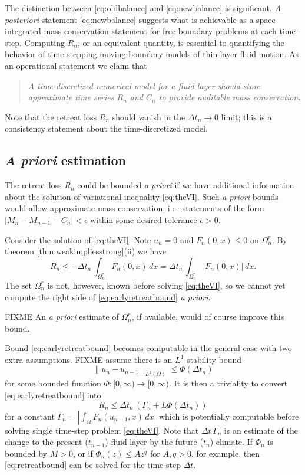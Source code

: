 \documentclass[final,onefignum]{siamart190516}
\newcommand\eps{\epsilon}
\begin{document}
The distinction between \eqref{eq:oldbalance} and \eqref{eq:newbalance} is significant.  \emph{A posteriori} statement \eqref{eq:newbalance} suggests what is achievable as a space-integrated mass conservation statement for free-boundary problems at each time-step.  Computing $R_n$, or an equivalent quantity, is essential to quantifying the behavior of time-stepping moving-boundary models of thin-layer fluid motion.  As an operational statement we claim that
\begin{quote}
\emph{A time-discretized numerical model for a fluid layer should store approximate time series $R_n$ and $C_n$ to provide auditable mass conservation.}
\end{quote}
Note that the retreat loss $R_n$ should vanish in the $\Delta t_n\to 0$ limit; this is a consistency statement about the time-discretized model.

\subsection{\emph{A priori} estimation} \label{subsec:apriori}   The retreat loss $R_n$ could be bounded \emph{a priori} if we have additional information about the solution of variational inequality \eqref{eq:theVI}.  Such \emph{a priori} bounds would allow approximate mass conservation, i.e.~statements of the form $|M_n - M_{n-1} - C_n|<\eps$ within some desired tolerance $\eps>0$.

Consider the solution of \eqref{eq:theVI}.  Note $u_n=0$ and $F_n(0,x)\le 0$ on $\Omega_n^r$.  By theorem \ref{thm:weakimpliesstrong}(ii) we have
\begin{equation}
R_n \le - \Delta t_n\,\int_{\Omega_n^r} F_n(0,x)\,dx = \Delta t_n\,\int_{\Omega_n^r} |F_n(0,x)|\,dx.  \label{eq:earlyretreatbound}
\end{equation}
The set $\Omega_n^r$ is not, however, known before solving \eqref{eq:theVI}, so we cannot yet compute the right side of \eqref{eq:earlyretreatbound} \emph{a priori}.

FIXME  An \emph{a priori} estimate of $\Omega_n^r$, if available, would of course improve this bound.

Bound \eqref{eq:earlyretreatbound} becomes computable in the general case with two extra assumptions.  FIXME assume there is an $L^1$ stability bound
\begin{equation}
\|u_n-u_{n-1}\|_{L^1(\Omega)} \le \Phi(\Delta t_n)
\end{equation}
for some bounded function $\Phi : [0,\infty) \to [0,\infty)$.  It is then a triviality to convert \eqref{eq:earlyretreatbound} into
\begin{equation}
R_n \le \Delta t_n\,\left(\Gamma_n + L \Phi(\Delta t_n)\right)   \label{eq:retreatbound}
\end{equation}
for a constant $\Gamma_n=\left|\int_{\Omega} F_n(u_{n-1},x)\,dx\right|$ which is potentially computable before solving single time-step problem \eqref{eq:theVI}.  Note that $\Delta t\,\Gamma_n$ is an estimate of the change to the present ($t_{n-1}$) fluid layer by the future ($t_n$) climate.  If $\Phi_n$ is bounded by $M>0$, or if $\Phi_n(z) \le A z^q$ for $A,q>0$, for example, then \eqref{eq:retreatbound} can be solved for the time-step $\Delta t$.
\end{document}
